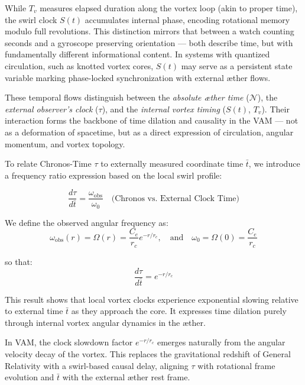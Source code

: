 \documentclass[preprint]{revtex4-2}
\begin{document}
\begin{tcolorbox}[colback=gray!5, colframe=black!70, sharp corners=southwest, title=Temporal Phase vs. Duration]
    While \(T_v\) measures elapsed duration along the vortex loop (akin to proper time), the swirl clock \(S(t)\) accumulates internal phase, encoding rotational memory modulo full revolutions. This distinction mirrors that between a watch counting seconds and a gyroscope preserving orientation — both describe time, but with fundamentally different informational content. In systems with quantized circulation, such as knotted vortex cores, \(S(t)\) may serve as a persistent state variable marking phase-locked synchronization with external æther flows.
\end{tcolorbox}


\noindent
These temporal flows distinguish between the \emph{absolute æther time} (\(\mathcal{N}\)), the \emph{external observer’s clock} (\(\tau\)), and the \emph{internal vortex timing} (\(S(t)\), \(T_v\)). Their interaction forms the backbone of time dilation and causality in the VAM — not as a deformation of spacetime, but as a direct expression of circulation, angular momentum, and vortex topology.

\medskip
To relate Chronos-Time $\tau$ to externally measured coordinate time $\bar{t}$, we introduce a frequency ratio expression based on the local swirl profile:

\begin{equation}
    \frac{d\tau}{d\bar{t}} = \frac{\omega_{\text{obs}}}{\omega_0}
    \quad \text{(Chronos vs. External Clock Time)}
\end{equation}

We define the observed angular frequency as:
\[
    \omega_{\text{obs}}(r) = \Omega(r) = \frac{C_e}{r_c} e^{-r/r_c}, \quad \text{and} \quad \omega_0 = \Omega(0) = \frac{C_e}{r_c}
\]

so that:
\[
    \frac{d\tau}{d\bar{t}} = e^{-r/r_c}
\]

This result shows that local vortex clocks experience exponential slowing relative to external time $\bar{t}$ as they approach the core. It expresses time dilation purely through internal vortex angular dynamics in the æther.

\begin{tcolorbox}[colback=gray!7, colframe=black!60, sharp corners=southwest, title=Frequency-Based Time Flow Interpretation]
    In VAM, the clock slowdown factor $e^{-r/r_c}$ emerges naturally from the angular velocity decay of the vortex. This replaces the gravitational redshift of General Relativity with a swirl-based causal delay, aligning $\tau$ with rotational frame evolution and $\bar{t}$ with the external æther rest frame.
\end{tcolorbox}
\end{document}
